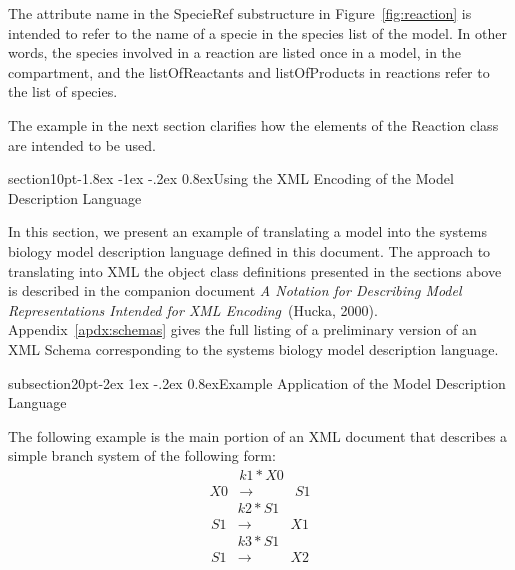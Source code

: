 \documentclass[10pt]{article}
\makeatletter
\renewcommand{\section}{\@startsection%
  {section}{1}{0pt}{-1.8ex \@plus -1ex \@minus -.2ex}%
  {0.8ex}{\normalfont\Large\bfseries}}
\renewcommand{\subsection}{\@startsection%
  {subsection}{2}{0pt}{-2ex \@plus 1ex \@minus -.2ex}%
  {0.8ex}{\slshape\large\bfseries}}
\newcommand{\class}[1]{\textsf{#1}}
\newcommand{\attrib}[1]{\textsf{#1}}
\makeatother
\begin{document}
The attribute \attrib{name} in the \class{SpecieRef} substructure in
Figure~\ref{fig:reaction} is intended to refer to the name of a specie in
the species list of the model.  In other words, the species involved in a
reaction are listed once in a model, in the compartment, and the
\attrib{listOfReactants} and \attrib{listOfProducts} in reactions refer to
the list of species.

The example in the next section clarifies how the elements of the
\class{Reaction} class are intended to be used.


\section{Using the XML Encoding of the Model Description Language}
\label{sec:xml-rep}

In this section, we present an example of translating a model into the
systems biology model description language defined in this document.  The
approach to translating into XML the object class definitions presented in
the sections above is described in the companion document \emph{A
  Notation for Describing Model Representations Intended for XML
  Encoding}~(Hucka, 2000).  Appendix~\ref{apdx:schemas} gives the full
listing of a preliminary version of an XML Schema corresponding to the
systems biology model description language.

\subsection{Example Application of the Model Description Language}

The following example is the main portion of an XML document that describes
a simple branch system of the following form:
\[
\begin{array}{ccc}
& {k1 * X0}\\
X0 & \longrightarrow & S1
\end{array}
\]
\[
\begin{array}{ccc}
& {k2 * S1}\\
S1 & \longrightarrow & X1
\end{array}
\]
\[
\begin{array}{ccc}
& {k3 * S1}\\
S1 & \longrightarrow & X2
\end{array}
\]
\end{document}
